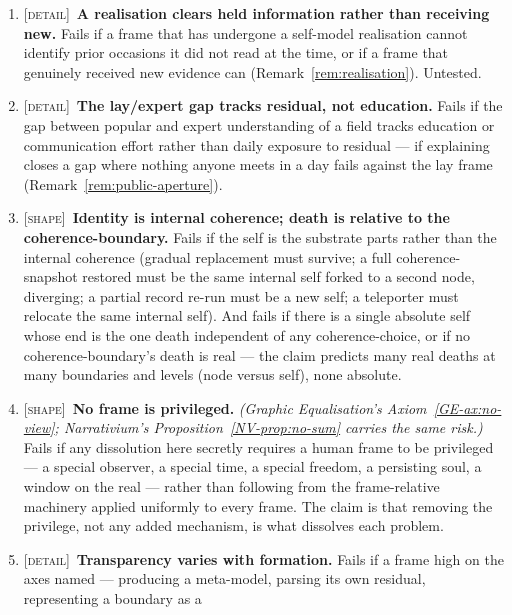 \documentclass[11pt,a4paper]{article}
\theoremstyle{remark}\newtheorem{remark}[definition]{Remark}
\begin{document}
\begin{enumerate}[leftmargin=*]
fact or shape of its own limit. The claim predicts that residual is the trace from which a boundary
is inferred, and that calibration is an acquirable capability rather than a fixed property --- so it
fails too if outside access always beats inside investment, making the common case a structural
necessity rather than the ordinary one.
\item \textsc{[detail]}~\textbf{A realisation clears held information rather than receiving new.}
Fails if a frame that has undergone a self-model realisation cannot identify prior occasions it did
not read at the time, or if a frame that genuinely received new evidence can
(Remark~\ref{rem:realisation}). Untested.
\item \textsc{[detail]}~\textbf{The lay/expert gap tracks residual, not education.} Fails if the gap
between popular and expert understanding of a field tracks education or communication effort rather
than daily exposure to residual --- if explaining closes a gap where nothing anyone meets in a day
fails against the lay frame (Remark~\ref{rem:public-aperture}).
\item \textsc{[shape]}~\textbf{Identity is internal coherence; death is relative to the
coherence-boundary.} Fails if the self is the substrate parts rather than the internal
coherence (gradual replacement must survive; a full coherence-snapshot restored must be
the same internal self forked to a second node, diverging; a partial record re-run must
be a new self; a teleporter must relocate the same internal self). And fails if there is
a single absolute self whose end is the one death independent of any coherence-choice, or
if no coherence-boundary's death is real --- the claim predicts many real deaths at many
boundaries and levels (node versus self), none absolute.
\item \textsc{[shape]}~\textbf{No frame is privileged.} \emph{(Graphic Equalisation's
Axiom~\ref{GE-ax:no-view}; \emph{Narrativium}'s Proposition~\ref{NV-prop:no-sum} carries the same
risk.)} Fails if any dissolution here secretly requires a
human frame to be privileged --- a special observer, a special time, a special freedom, a
persisting soul, a window on the real --- rather than following from the frame-relative
machinery applied uniformly to every frame. The claim is that removing the privilege, not
any added mechanism, is what dissolves each problem.
\item \textsc{[detail]}~\textbf{Transparency varies with formation.} Fails if a frame high on the
axes named --- producing a meta-model, parsing its own residual, representing a boundary as a

\end{enumerate}
\end{document}
